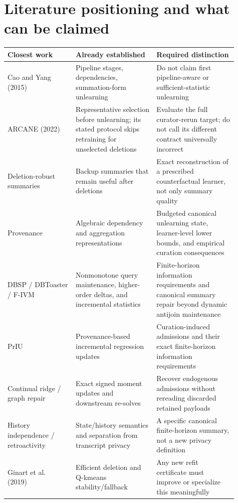 \documentclass[11pt,a4paper]{article}
\theoremstyle{definition}\newtheorem{definition}[theorem]{Definition}
\begin{document}
\section{Literature positioning and what can be claimed}
\begin{longtable}{p{0.27\linewidth}p{0.32\linewidth}p{0.32\linewidth}}
\toprule
Closest work & Already established & Required distinction\\\midrule\endhead
Cao and Yang (2015)~\cite{cao2015} & Pipeline stages, dependencies, summation-form unlearning & Do not claim first pipeline-aware or sufficient-statistic unlearning\\[4pt]
ARCANE (2022)~\cite{arcane} & Representative selection before unlearning; its stated protocol skips retraining for unselected deletions & Evaluate the full curator-rerun target; do not call its different contract universally incorrect\\[4pt]
Deletion-robust summaries~\cite{mirzasoleiman2017,kazemi2018} & Backup summaries that remain useful after deletions & Exact reconstruction of a prescribed counterfactual learner, not only summary quality\\[4pt]
Provenance~\cite{green2007,amsterdamer2011} & Algebraic dependency and aggregation representations & Budgeted canonical unlearning state, learner-level lower bounds, and empirical curation consequences\\[4pt]
DBSP / DBToaster / F-IVM~\cite{dbsp2023,dbtoaster2012,fivm2023} & Nonmonotone query maintenance, higher-order deltas, and incremental statistics & Finite-horizon information requirements and canonical summary repair beyond dynamic antijoin maintenance\\[4pt]
PrIU~\cite{priu2020} & Provenance-based incremental regression updates & Curation-induced admissions and their exact finite-horizon information requirements\\[4pt]
Continual ridge / graph repair~\cite{quan2026,gaur2026} & Exact signed moment updates and downstream re-solves & Recover endogenous admissions without rereading discarded retained payloads\\[4pt]
History independence / retroactivity~\cite{cohen2023,kaplan2026} & State/history semantics and separation from transcript privacy & A specific canonical finite-horizon summary, not a new privacy definition\\[4pt]
Ginart et al. (2019)~\cite{ginart2019} & Efficient deletion and Q-kmeans stability/fallback & Any new refit certificate must improve or specialize this meaningfully\\[4pt]

\end{longtable}
\end{document}
